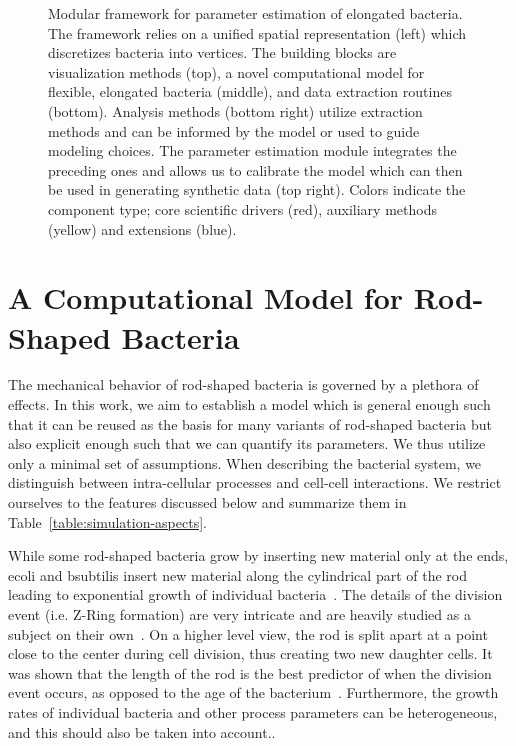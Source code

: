 \documentclass[10pt,letterpaper]{article}
\begin{document}
\begin{figure}[H]
    \centering
    
    \caption{
        Modular framework for parameter estimation of elongated bacteria.
        The framework relies on a unified spatial representation (left) which discretizes
        bacteria into vertices.
        The building blocks are visualization methods (top), a novel computational model for
        flexible, elongated bacteria (middle), and data extraction routines (bottom).
        Analysis methods (bottom right) utilize extraction methods and can be informed by the model
        or used to guide modeling choices.
        The parameter estimation module integrates the preceding ones and allows us to calibrate the
        model which can then be used in generating synthetic data (top right).
        Colors indicate the component type; core scientific drivers (red), auxiliary methods (yellow)
        and extensions (blue).
    }
    \label{fig:flowchart-project-structure}
\end{figure}

\section{A Computational Model for Rod-Shaped Bacteria}
\label{sec:computational-model}

The mechanical behavior of rod-shaped bacteria is governed by a plethora of effects.
In this work, we aim to establish a model which is general enough such that it can be reused as the
basis for many variants of rod-shaped bacteria but also explicit enough such that we can quantify
its parameters. We thus utilize only a minimal set of assumptions.
When describing the bacterial system, we distinguish between intra-cellular processes and cell-cell
interactions. We restrict ourselves to the features discussed below and summarize them in
Table~\ref{table:simulation-aspects}.

While some rod-shaped bacteria grow by inserting new material only at the ends, \ac{ecoli} and
\ac{bsubtilis} insert new material along the cylindrical part of the rod leading to exponential
growth of individual bacteria~\cite{Amir2014,Takeuchi2005}.
The details of the division event (i.e. Z-Ring formation) are very intricate and are heavily
studied as a subject on their own~\cite{Harry2001}.
On a higher level view, the rod is split apart at a point close to the center during cell division,
thus creating two new daughter cells.
It was shown that the length of the rod is the best predictor of when the division event occurs, as
opposed to the age of the bacterium~\cite{Robert2014}.
Furthermore, the growth rates of individual bacteria and other process parameters can be
heterogeneous, and this should also be taken into account.\cite{Koutsoumanis2013}.
\end{document}
